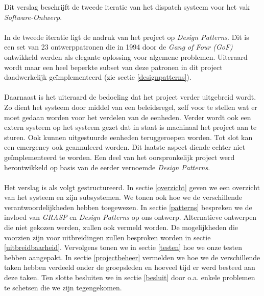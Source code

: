 Dit verslag beschrijft de tweede iteratie van het dispatch systeem voor het vak \textit{Software-Ontwerp}.
\paragraph{}
In de tweede iteratie ligt de nadruk van het project op \textit{Design Patterns}. Dit is een set van 23 ontwerppatronen die in 1994 door de \textit{Gang of Four (GoF)} ontwikkeld werden als elegante oplossing voor algemene problemen. Uiteraard wordt maar een heel beperkte subset van deze patronen in dit project daadwerkelijk ge\"implementeerd (zie sectie \ref{designpatterns}).
\paragraph{}
Daarnaast is het uiteraard de bedoeling dat het project verder uitgebreid wordt. Zo dient het systeem door middel van een beleidsregel, zelf voor te stellen wat er moet gedaan worden voor het verdelen van de eenheden. Verder wordt ook een extern systeem op het systeem gezet dat in staat is machinaal het project aan te sturen. Ook kunnen uitgestuurde eenheden teruggeroepen worden. Tot slot kan een emergency ook geannuleerd worden. Dit laatste aspect diende echter niet ge\"implementeerd te worden.
Een deel van het oorspronkelijk project werd herontwikkeld op basis van de eerder vernoemde \textit{Design Patterns}.
\paragraph{}
Het verslag is als volgt gestructureerd. In sectie \ref{overzicht} geven we een overzicht van het systeem en zijn subsystemen.
We tonen ook hoe we de verschillende verantwoordelijkheden hebben toegewezen.
In sectie \ref{patterns} bespreken we de invloed van \textit{GRASP} en \textit{Design Patterns} op ons ontwerp.
Alternatieve ontwerpen die niet gekozen werden, zullen ook vermeld worden.
De mogelijkheden die voorzien zijn voor uitbreidingen zullen besproken worden in sectie \ref{uitbreidbaarheid}.
Vervolgens tonen we in sectie \ref{testen} hoe we onze testen hebben aangepakt.
In sectie \ref{projectbeheer} vermelden we hoe we de verschillende taken hebben verdeeld onder de groepsleden
en hoeveel tijd er werd besteed aan deze taken.
Ten slotte besluiten we in sectie \ref{besluit} door o.a. enkele problemen te schetsen die we zijn tegengekomen.
